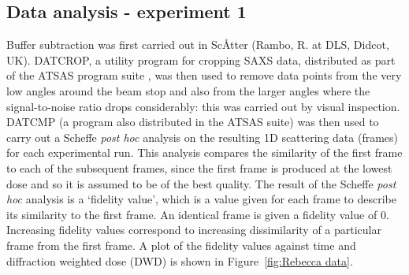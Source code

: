 \subsection{Data analysis - experiment 1}
\label{sub:Data analysis - experiment 1}
Buffer subtraction was first carried out in Sc\AA tter (Rambo, R. at DLS, Didcot, UK).
DATCROP, a utility program for cropping SAXS data, distributed as part of the ATSAS program suite \cite{petoukhov2012new}, was then used to remove data points from the very low angles around the beam stop and also from the larger angles where the signal-to-noise ratio drops considerably: this was carried out by visual inspection.
DATCMP (a program also distributed in the ATSAS suite) was then used to carry out a Scheffe \textit{post hoc} analysis on the resulting 1D scattering data (frames) for each experimental run.
This analysis compares the similarity of the first frame to each of the subsequent frames, since the first frame is produced at the lowest dose and so it is assumed to be of the best quality.
The result of the Scheffe \textit{post hoc} analysis is a `fidelity value', which is a value given for each frame to describe its similarity to the first frame.
An identical frame is given a fidelity value of 0.
Increasing fidelity values correspond to increasing dissimilarity of a particular frame from the first frame.
A plot of the fidelity values against time and diffraction weighted dose (DWD) is shown in Figure~\ref{fig:Rebecca data}.
